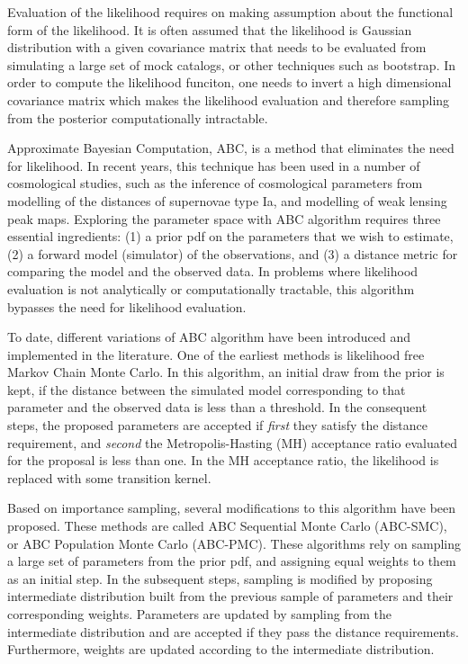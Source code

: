 \documentclass[12pt, preprint]{aastex}
\begin{document}
Evaluation of the likelihood requires on making assumption about the functional 
form of the likelihood. It is often assumed that the likelihood is Gaussian distribution 
with a given covariance matrix that needs to be evaluated from simulating a large set of 
mock catalogs, or other techniques such as bootstrap. In order to 
compute the likelihood funciton, one needs to invert a high dimensional covariance 
matrix which makes the likelihood evaluation and therefore sampling from the posterior 
computationally intractable.

Approximate Bayesian Computation, ABC, is a method that eliminates the need for likelihood. 
In recent years, this technique has been used in a number of cosmological studies, such as 
the inference of cosmological parameters from modelling of the distances of supernovae type Ia, 
and modelling of weak lensing peak maps. Exploring the parameter space with ABC algorithm 
requires three essential ingredients: (1) a prior pdf on the parameters that we wish to estimate, 
(2) a forward model (simulator) of the observations, and (3) a distance metric for comparing 
the model and the observed data. In problems where likelihood evaluation is not analytically or 
computationally tractable, this algorithm bypasses the need for likelihood evaluation.

To date, different variations of ABC algorithm have been introduced  and implemented 
in the literature. One of the earliest methods is likelihood free Markov Chain Monte 
Carlo. In this algorithm, an initial draw from the prior is kept, if the distance between 
the simulated model corresponding to that parameter and the observed data is less than a threshold. 
In the consequent steps, the proposed parameters are accepted if \emph{first} they satisfy the 
distance requirement, and \emph{second} the Metropolis-Hasting (MH) acceptance ratio evaluated for the 
proposal is less than one. In the MH acceptance ratio, the likelihood is replaced with some transition 
kernel. 

Based on importance sampling, several modifications to this algorithm have been proposed. 
These methods are called ABC Sequential Monte Carlo (ABC-SMC), or ABC Population Monte Carlo 
(ABC-PMC). These algorithms rely on sampling a large set of parameters from the prior pdf, and assigning 
equal weights to them as an initial step. In the subsequent steps, sampling is modified by 
proposing intermediate distribution built from the previous sample of parameters and their 
corresponding weights. Parameters are updated by sampling from the intermediate distribution 
and are accepted if they pass the distance requirements. Furthermore, weights are updated according 
to the intermediate distribution. 
\end{document}
